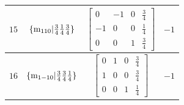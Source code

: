 \documentclass[fleqn,8pt]{jsarticle}
\begin{document}
\begin{longtable}{cccc}
$ 15 $ & $ \{{\rm m}_{110}|\frac{3}{4} \frac{1}{4} \frac{3}{4}\} $ & $ \begin{bmatrix} 0 & -1 & 0 & \frac{3}{4} \\ -1 & 0 & 0 & \frac{1}{4} \\ 0 & 0 & 1 & \frac{3}{4} \end{bmatrix} $ & $ -1 $ \\ \hline
$ 16 $ & $ \{{\rm m}_{1-10}|\frac{3}{4} \frac{3}{4} \frac{1}{4}\} $ & $ \begin{bmatrix} 0 & 1 & 0 & \frac{3}{4} \\ 1 & 0 & 0 & \frac{3}{4} \\ 0 & 0 & 1 & \frac{1}{4} \end{bmatrix} $ & $ -1 $ \\
\end{longtable}
\end{document}
